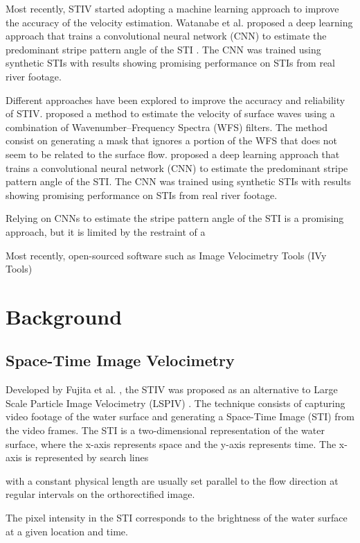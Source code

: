 \documentclass[12pt]{elsarticle}
\begin{document}
Most recently, STIV started adopting a machine learning approach to improve the accuracy of the velocity estimation. Watanabe et al. proposed a deep learning approach that trains a convolutional neural network (CNN) to estimate the predominant stripe pattern angle of the STI \cite{watanabe2021improving}. The CNN was trained using synthetic STIs with results showing promising performance on STIs from real river footage.

Different approaches have been explored to improve the accuracy and reliability of STIV. \cite{fujita2020application} proposed a method to estimate the velocity of surface waves using a combination of Wavenumber–Frequency Spectra (WFS) filters. The method consist on generating a mask that ignores a portion of the WFS that does not seem to be related to the surface flow. \cite{watanabe2021improving} proposed a deep learning approach that trains a convolutional neural network (CNN) to estimate the predominant stripe pattern angle of the STI. The CNN was trained using synthetic STIs with results showing promising performance on STIs from real river footage.

Relying on CNNs to estimate the stripe pattern angle of the STI is a promising approach, but it is limited by the restraint of a 

Most recently, open-sourced software such as Image Velocimetry Tools (IVy Tools) \cite{engel2025ivytools}


\section{Background}
\subsection{Space-Time Image Velocimetry}
Developed by Fujita et al. \cite{fujita2007development}, the STIV was proposed as an alternative to Large Scale Particle Image Velocimetry (LSPIV) \cite{fujita1998large}. The technique consists of capturing video footage of the water surface and generating a Space-Time Image (STI) from the video frames. The STI is a two-dimensional representation of the water surface, where the x-axis represents space and the y-axis represents time. The x-axis is represented by search lines

with a constant physical length are usually set parallel to the flow direction at regular intervals on the orthorectified image.

The pixel intensity in the STI corresponds to the brightness of the water surface at a given location and time.
\end{document}
